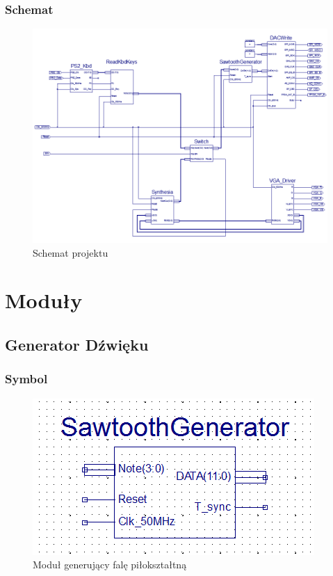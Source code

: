 \documentclass[a4paper]{report}
\begin{document}
		\begin{landscape}
			\subsection{Schemat}
				\begin{figure}[h!]
					\centering
					\includegraphics[width=1.1\textwidth]{schemat.png}
					\caption{Schemat projektu}
				\end{figure}
		\end{landscape}

\chapter{Moduły}
	\section{Generator Dźwięku}
		\subsection{Symbol}
			\begin{figure}[h!]
				\centering
				\includegraphics{sawtoothgenerator2.png}
				\caption{Moduł generujący falę piłokształtną}
			\end{figure}
\end{document}

